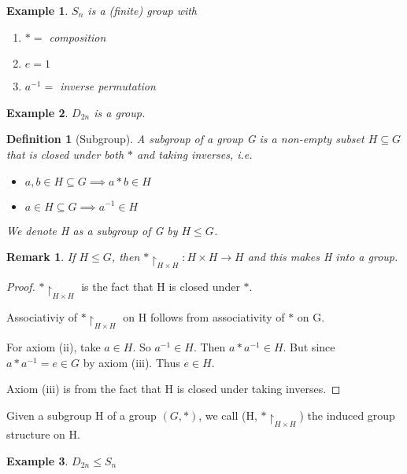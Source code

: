 \documentclass[11pt, oneside]{book}
\theoremstyle{break}
\newtheorem*{proof}{Proof}
\newtheorem*{remark}{Remark}
\newtheorem{defn}{Definition}[section]
\newtheorem{eg}{Example}[section]
\begin{document}
\begin{eg}
    $S_n$ is a (finite) group with
    \begin{enumerate}
        \item $* = $ composition
        \item $e = 1$
        \item $a^{-1} = $ inverse permutation
    \end{enumerate}
\end{eg}

\begin{eg}
    $D_{2n}$ is a group.
\end{eg}

\begin{defn}[Subgroup]
    A subgroup of a group G is a non-empty subset $H \subseteq G$ that is closed under both $*$ and taking inverses, i.e.
    \begin{itemize}
        \item $a, b \in H \subseteq G \implies a * b \in H$
        \item $a \in H \subseteq G \implies a^{-1} \in H$
    \end{itemize}

    We denote H as a subgroup of G by $H \leq G$.
\end{defn}

\begin{remark}
    If $H \leq G$, then $*\restriction_{H \times H} : H \times H \to H$ and this makes H into a group.
\end{remark}

\begin{proof}
    $* \restriction_{H \times H}$
    is the fact that H is closed under $*$.

    Associativiy of $* \restriction_{H \times H}$ on H follows from associativity of $*$ on G.

    For axiom (ii), take $a \in H$. So $a^{-1} \in H$. Then $a * a^{-1} \in H$. But since $a * a^{-1} = e \in G$ by axiom (iii). Thus $e \in H$.

    Axiom (iii) is from the fact that H is closed under taking inverses.
\end{proof}

Given a subgroup H of a group $(G, *)$, we call (H, $*\restriction_{H \times H}$) the induced group structure on H.

\begin{eg}
    $D_{2n} \leq S_n$
\end{eg}
\end{document}
